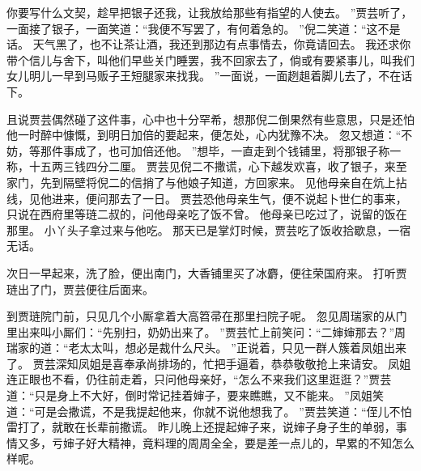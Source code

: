 你要写什么文契，趁早把银子还我，让我放给那些有指望的人使去。
”贾芸听了，一面接了银子，一面笑道：“我便不写罢了，有何着急的。
”倪二笑道：“这不是话。
天气黑了，也不让茶让酒，我还到那边有点事情去，你竟请回去。
我还求你带个信儿与舍下，叫他们早些关门睡罢，我不回家去了，倘或有要紧事儿，叫我们女儿明儿一早到马贩子王短腿家来找我。
”一面说，一面趔趄着脚儿去了，不在话下。
\par
且说贾芸偶然碰了这件事，心中也十分罕希，想那倪二倒果然有些意思，只是还怕他一时醉中慷慨，到明日加倍的要起来，便怎处，心内犹豫不决。
忽又想道：“不妨，等那件事成了，也可加倍还他。
”想毕，一直走到个钱铺里，将那银子称一称，十五两三钱四分二厘。
贾芸见倪二不撒谎，心下越发欢喜，收了银子，来至家门，先到隔壁将倪二的信捎了与他娘子知道，方回家来。
见他母亲自在炕上拈线，见他进来，便问那去了一日。
贾芸恐他母亲生气，便不说起卜世仁的事来，只说在西府里等琏二叔的，问他母亲吃了饭不曾。
他母亲已吃过了，说留的饭在那里。
小丫头子拿过来与他吃。
那天已是掌灯时候，贾芸吃了饭收拾歇息，一宿无话。
\par
次日一早起来，洗了脸，便出南门，大香铺里买了冰麝，便往荣国府来。
打听贾琏出了门，贾芸便往后面来。
\par
到贾琏院门前，只见几个小厮拿着大高笤帚在那里扫院子呢。
忽见周瑞家的从门里出来叫小厮们：“先别扫，奶奶出来了。
”贾芸忙上前笑问：“二婶婶那去？”周瑞家的道：“老太太叫，想必是裁什么尺头。
”正说着，只见一群人簇着凤姐出来了。
贾芸深知凤姐是喜奉承尚排场的，忙把手逼着，恭恭敬敬抢上来请安。
凤姐连正眼也不看，仍往前走着，只问他母亲好，“怎么不来我们这里逛逛？”贾芸道：“只是身上不大好，倒时常记挂着婶子，要来瞧瞧，又不能来。
”凤姐笑道：“可是会撒谎，不是我提起他来，你就不说他想我了。
”贾芸笑道：“侄儿不怕雷打了，就敢在长辈前撒谎。
昨儿晚上还提起婶子来，说婶子身子生的单弱，事情又多，亏婶子好大精神，竟料理的周周全全，要是差一点儿的，早累的不知怎么样呢。
